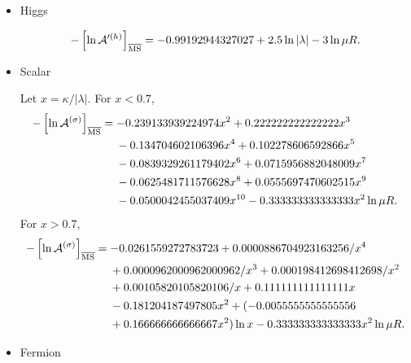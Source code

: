 \documentclass[12pt]{article}
\begin{document}
\begin{itemize}
 \item Higgs

       \begin{align}
        -\left[\ln\mathcal A'^{(h)}\right]_{\overline{\rm MS}} = -0.99192944327027 + 2.5\ln|\lambda| -
        3\ln\mu R.
       \end{align}
 \item Scalar

       Let $x = \kappa/|\lambda|$.
       For $x<0.7$,
       \begin{align}
        -\left[
         \ln\mathcal A^{(\sigma)}
        \right]_{\overline{\rm MS}}
         & = -0.239133939224974 x^2 + 0.222222222222222 x^3\nonumber                 \\
         & \hspace{3ex} - 0.134704602106396 x^4 + 0.102278606592866 x^5\nonumber     \\
         & \hspace{3ex} - 0.0839329261179402 x^6 + 0.0715956882048009 x^7\nonumber   \\
         & \hspace{3ex} - 0.0625481711576628 x^8 + 0.0555697470602515 x^9\nonumber   \\
         & \hspace{3ex} - 0.0500042455037409 x^{10} - 0.333333333333333 x^2\ln\mu R.
       \end{align}
       For $x>0.7$,
       \begin{align}
        -\left[\ln\mathcal A^{(\sigma)}\right]_{\overline{\rm MS}}
         & = -0.0261559272783723 + 0.0000886704923163256/x^4\nonumber                   \\
         & \hspace{3ex} + 0.0000962000962000962/x^3 + 0.000198412698412698/x^2\nonumber \\
         & \hspace{3ex} + 0.00105820105820106/x + 0.111111111111111 x\nonumber          \\
         & \hspace{3ex} - 0.181204187497805 x^2 + (-0.0055555555555556\nonumber         \\
         & \hspace{3ex} + 0.166666666666667 x^2)\ln x - 0.333333333333333 x^2 \ln\mu R.
       \end{align}
 \item Fermion


\end{itemize}
\end{document}
